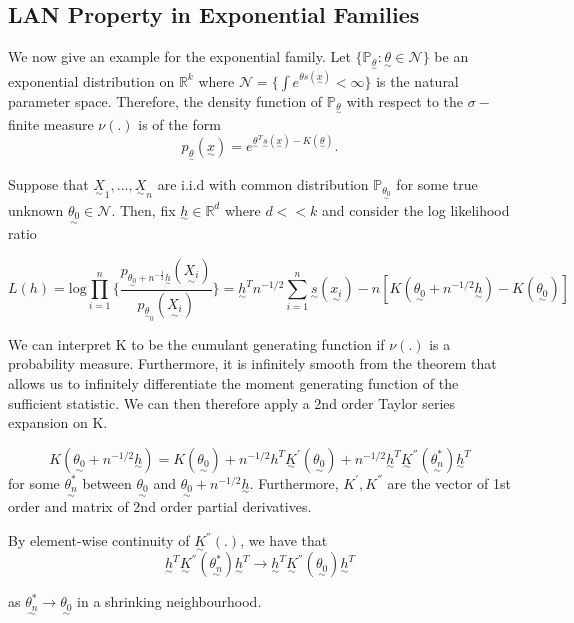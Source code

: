 \documentclass[twoside]{article}
\newcommand{\prob}{\mathbb{P}}
\newcommand{\utilde}{\underset{\sim}}
\begin{document}
\subsection{LAN Property in Exponential Families}

We now give an example for the exponential family. Let $\{\prob_{\utilde{\theta}}: \utilde{\theta} \in \mathcal{N}\}$ be an exponential distribution on $\mathbb{R}^k$ where $\mathcal{N} = \{\int e^{\theta s(\utilde{x})} < \infty\}$ is the natural parameter space. Therefore, the density function of $\prob_{\utilde{\theta}}$ with respect to the $\sigma-$finite measure $\nu(.)$ is of the form 
$$
p_{\utilde{\theta}}(\utilde{x}) = e^{\utilde{\theta}^T\utilde{s}(\utilde{x}) - K(\utilde{\theta})}.
$$

Suppose that $\utilde{X}_1,...,\utilde{X}_n$ are i.i.d with common distribution $\prob_{\utilde{\theta_0}}$ for some true unknown $\utilde{\theta_0} \in \mathcal{N}.$ Then, fix $\utilde{h} \in \mathbb{R}^d$ where $d << k$ and consider the log likelihood ratio 

\begin{equation}
L(h) = \text{log} \prod_{i=1}^{n} \bigg\{ \frac{p_{\utilde{\theta_0} + n^{-\frac{1}{2}}\utilde{h}}(\utilde{X_i}) }{p_{\utilde{\theta}_{0}}(\utilde{X_i}) }\bigg\} = \utilde{h}^Tn^{-1/2}\sum_{i=1}^{n}\utilde{s}(\utilde{x_i}) - n[K(\utilde{\theta_0} + n^{-1/2}\utilde{h}) - K(\utilde{\theta_0})] \tag{*}
\end{equation}

We can interpret K to be the cumulant generating function if $\nu(.)$ is a probability measure. Furthermore, it is infinitely smooth from the theorem that allows us to infinitely differentiate the moment generating function of the sufficient statistic. We can then therefore apply a 2nd order Taylor series expansion on K.

$$
K(\utilde{\theta_0} + n^{-1/2}\utilde{h}) = K(\utilde{\theta_0}) + n^{-1/2}h^T\utilde{K}^{'}(\utilde{\theta_0}) + n^{-1/2}\utilde{h}^T\utilde{K}^{''}(\utilde{\theta_n^*})\utilde{h}^T
$$
for some $\utilde{\theta_n^*}$ between $\utilde{\theta_0}$ and $\utilde{\theta_0} + n^{-1/2}\utilde{h}.$ Furthermore, $K^{'}, K^{''}$ are the vector of 1st order and matrix of 2nd order partial derivatives.

By element-wise continuity of $\utilde{K}^{''}(.)$, we have that 
$$
\utilde{h}^T\utilde{K}^{''}(\utilde{\theta_n^*})\utilde{h}^T \rightarrow \utilde{h}^T\utilde{K}^{''}(\utilde{\theta_0})\utilde{h}^T 
$$

as $\utilde{\theta_n^*} \rightarrow \utilde{\theta_0}$ in a shrinking neighbourhood.
\end{document}

